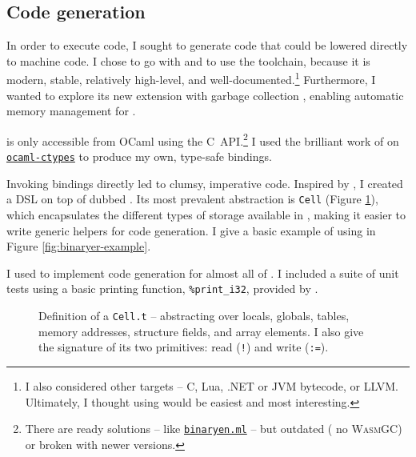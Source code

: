 \subsection{Code generation} 
\label{subsec:codegen}

In order to execute \fabric{} code, I sought to generate code that could be lowered directly to machine code. I chose to go with \wasm{} \cite{wasm} and to use the \binaryen{} \cite{binaryen} toolchain, because it is modern, stable, relatively high-level, and well-documented.\footnote{I also considered other targets -- C, Lua, .NET or JVM bytecode, or LLVM. Ultimately, I thought using \wasm{} would be easiest and most interesting.} Furthermore, I wanted to explore its new extension with garbage collection \cite{wasm-gc}, enabling automatic memory management for \fabric{}.

\binaryen{} is only accessible from OCaml using the C~API.\footnote{There are ready solutions -- like \href{https://github.com/grain-lang/binaryen.ml}{\texttt{binaryen.ml}} -- but outdated (\eg{} no \textsc{WasmGC}) or broken with newer \binaryen{} versions.} I used the brilliant work of \textcite{ocaml-ctypes} on \href{https://github.com/yallop/ocaml-ctypes}{\texttt{ocaml-ctypes}} to produce my own, type-safe bindings.

Invoking bindings directly led to clumsy, imperative code. Inspired by \textcite{offshoring-c}, I created a DSL on top of \binaryen{} dubbed \binaryendsl{}. Its most prevalent abstraction is \texttt{Cell} (Figure \ref{fig:cell-def}), which encapsulates the different types of storage available in \wasm{}, making it easier to write generic helpers for code generation.
I give a basic example of using \binaryendsl{} in Figure \ref{fig:binaryer-example}. 

I used \binaryendsl{} to implement code generation for almost all of \fabric{}. I included a suite of unit tests using a basic printing function, \texttt{\%print\_i32}, provided by \binaryen{}.

\begin{figure}[p]
    \centering
    
    \caption{Definition of a \texttt{Cell.t} -- abstracting over locals, globals, tables, memory addresses, structure fields, and array elements. I also give the signature of its two primitives: read (\texttt{!}) and write (\texttt{:=}). 
    }
    \label{fig:cell-def}
\end{figure}

